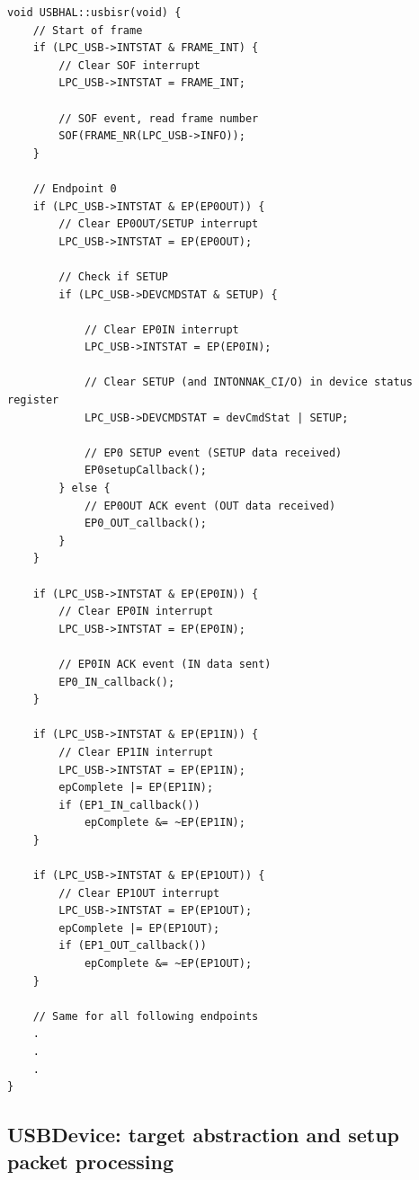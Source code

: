 \documentclass[pdftex,10pt,a4paper]{report}
\begin{document}
\begin{lstlisting}[label=Main part of the USB interrupt handler,caption=Main part of the USB interrupt handler]
void USBHAL::usbisr(void) {
    // Start of frame
    if (LPC_USB->INTSTAT & FRAME_INT) {
        // Clear SOF interrupt
        LPC_USB->INTSTAT = FRAME_INT;

        // SOF event, read frame number
        SOF(FRAME_NR(LPC_USB->INFO));
    }

    // Endpoint 0
    if (LPC_USB->INTSTAT & EP(EP0OUT)) {
        // Clear EP0OUT/SETUP interrupt
        LPC_USB->INTSTAT = EP(EP0OUT);

        // Check if SETUP
        if (LPC_USB->DEVCMDSTAT & SETUP) {

            // Clear EP0IN interrupt
            LPC_USB->INTSTAT = EP(EP0IN);

            // Clear SETUP (and INTONNAK_CI/O) in device status register
            LPC_USB->DEVCMDSTAT = devCmdStat | SETUP;

            // EP0 SETUP event (SETUP data received)
            EP0setupCallback();
        } else {
            // EP0OUT ACK event (OUT data received)
            EP0_OUT_callback();
        }
    }

    if (LPC_USB->INTSTAT & EP(EP0IN)) {
        // Clear EP0IN interrupt
        LPC_USB->INTSTAT = EP(EP0IN);

        // EP0IN ACK event (IN data sent)
        EP0_IN_callback();
    }

    if (LPC_USB->INTSTAT & EP(EP1IN)) {
        // Clear EP1IN interrupt
        LPC_USB->INTSTAT = EP(EP1IN);
        epComplete |= EP(EP1IN);
        if (EP1_IN_callback())
            epComplete &= ~EP(EP1IN);
    }

    if (LPC_USB->INTSTAT & EP(EP1OUT)) {
        // Clear EP1OUT interrupt
        LPC_USB->INTSTAT = EP(EP1OUT);
        epComplete |= EP(EP1OUT);
        if (EP1_OUT_callback())
            epComplete &= ~EP(EP1OUT);
    }
    
    // Same for all following endpoints
    .
    .
    .
}\end{lstlisting}


\subsection{USBDevice: target abstraction and setup packet processing}
\end{document}
